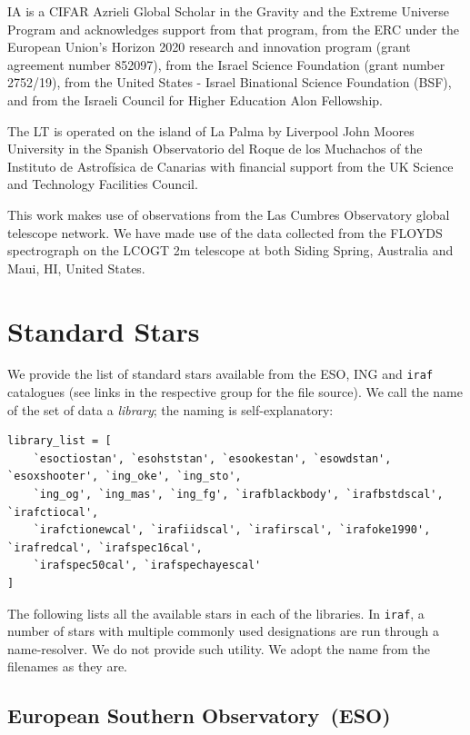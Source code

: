 \documentclass[twocolumn, linenumbers]{aastex631}
\begin{document}
IA is a CIFAR Azrieli Global Scholar in the Gravity and the Extreme Universe Program and acknowledges support from that program, from the ERC under the European Union's Horizon 2020 research and innovation program (grant agreement number 852097), from the Israel Science Foundation (grant number 2752/19), from the United States - Israel Binational Science Foundation (BSF), and from the Israeli Council for Higher Education Alon Fellowship.

The LT is operated on the island of La Palma by Liverpool
John Moores University in the Spanish Observatorio del Roque
de los Muchachos of the Instituto de Astrof{\'i}sica de Canarias with
financial support from the UK Science and Technology Facilities
Council.

This work makes use of observations from the Las Cumbres Observatory
global telescope network. We have made use of the data collected from
the FLOYDS spectrograph on the LCOGT 2m telescope at both Siding Spring,
Australia and Maui, HI, United States.

\appendix

\section{Standard Stars}
\label{appendix:standards}
We provide the list of standard stars available from the ESO, ING and \texttt{iraf} catalogues (see
links in the respective group for the file source). We call the name of the set of
data a \textit{library}; the naming is self-explanatory:

\begin{verbatim}
library_list = [
    `esoctiostan', `esohststan', `esookestan', `esowdstan', `esoxshooter', `ing_oke', `ing_sto',
    `ing_og', `ing_mas', `ing_fg', `irafblackbody', `irafbstdscal', `irafctiocal', 
    `irafctionewcal', `irafiidscal', `irafirscal', `irafoke1990', `irafredcal', `irafspec16cal',
    `irafspec50cal', `irafspechayescal'
]
\end{verbatim}

The following lists all the available stars in each of the libraries.
In \texttt{iraf}, a number of stars with multiple commonly used designations
are run through a name-resolver. We do not provide such utility.
We adopt the name from the filenames as they are.

\subsection{European Southern Observatory~(ESO)}
\end{document}
